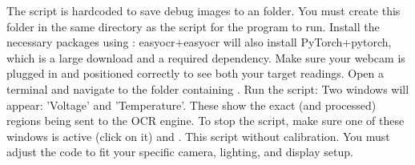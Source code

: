 {}
\markdownRendererSectionEnd \markdownRendererSectionBegin
{}\markdownRendererInterblockSeparator
{}\markdownRendererUlBegin
\markdownRendererUlItem {} The script is hardcoded to save debug images to an  folder. You must create this folder in the same directory as the script for the program to run. \markdownRendererUlItemEnd 
\markdownRendererUlItem {} Install the necessary packages using : \markdownRendererInterblockSeparator
{}\markdownRendererBlockQuoteBegin
{} easyocr+{}{}{easyocr} will also install PyTorch+{}{}{pytorch}, which is a large download and a required dependency.
\markdownRendererBlockQuoteEnd \markdownRendererUlItemEnd 
\markdownRendererUlEnd \markdownRendererInterblockSeparator
{}
\markdownRendererSectionEnd 
\markdownRendererSectionEnd \markdownRendererSectionBegin
{}\markdownRendererInterblockSeparator
{}\markdownRendererOlBeginTight
{}Make sure your webcam is plugged in and positioned correctly to see both your target readings.\markdownRendererOlItemEnd 
{}Open a terminal and navigate to the folder containing .\markdownRendererOlItemEnd 
{}Run the script: \markdownRendererOlItemEnd 
{}Two windows will appear: 'Voltage' and 'Temperature'. These show the exact (and processed) regions being sent to the OCR engine.\markdownRendererOlItemEnd 
{}To stop the script, make sure one of these windows is active (click on it) and .\markdownRendererOlItemEnd 
\markdownRendererOlEndTight \markdownRendererInterblockSeparator
{}
\markdownRendererSectionEnd \markdownRendererSectionBegin
{}\markdownRendererInterblockSeparator
{}This script  without calibration. You must adjust the code to fit your specific camera, lighting, and display setup.\markdownRendererInterblockSeparator
